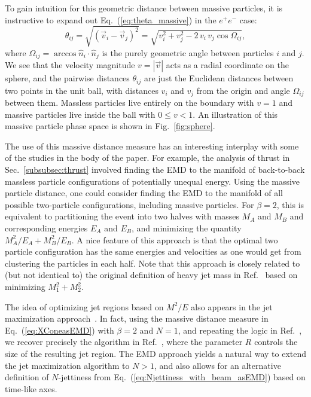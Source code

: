 \documentclass[letterpaper,11pt]{article}
\DeclareRobustCommand{\Sec}[1]{Sec.~\ref{#1}}
\DeclareRobustCommand{\Fig}[1]{Fig.~\ref{#1}}
\DeclareRobustCommand{\Eq}[1]{Eq.~(\ref{#1})}
\DeclareRobustCommand{\Ref}[1]{Ref.~\cite{#1}}
\begin{document}
To gain intuition for this geometric distance between massive particles, it is instructive to expand out \Eq{eq:theta_massive} in the $e^+e^-$ case:
%
\begin{equation}
\theta_{ij}=\sqrt{\left(\vec v_i-\vec v_j\right)^2}=\sqrt{v_i^2+v_j^2 - 2 \, v_i \, v_j \cos \Omega_{ij}},
\end{equation}
%
where $\Omega_{ij}=\arccos \hat n_i\cdot \hat n_j$ is the purely geometric angle between particles $i$ and $j$.
%
We see that the velocity magnitude $v = |\vec{v}|$ acts as a radial coordinate on the sphere, and the pairwise distances $\theta_{ij}$ are just the Euclidean distances between two points in the unit ball, with distances $v_i$ and $v_j$ from the origin and angle $\Omega_{ij}$ between them.
%
Massless particles live entirely on the boundary with $v=1$ and massive particles live inside the ball with $0\le v<1$.
%
An illustration of this massive particle phase space is shown in \Fig{fig:sphere}.


The use of this massive distance measure has an interesting interplay with some of the studies in the body of the paper.
%
For example, the analysis of thrust in \Sec{subsubsec:thrust} involved finding the EMD to the manifold of back-to-back massless particle configurations of potentially unequal energy.
%
Using the massive particle distance, one could consider finding the EMD to the manifold of all possible two-particle configurations, including massive particles.
%
For $\beta = 2$, this is equivalent to partitioning the event into two halves with masses $M_A$ and $M_B$ and corresponding energies $E_A$ and $E_B$, and minimizing the quantity $M_A^2 / E_A + M_B^2 / E_B$.
%
A nice feature of this approach is that the optimal two particle configuration has the same energies and velocities as one would get from clustering the particles in each half.
%
Note that this approach is closely related to (but not identical to) the original definition of heavy jet mass in \Ref{Clavelli:1981yh} based on minimizing $M_1^2 + M_2^2$.


The idea of optimizing jet regions based on $M^2 / E$ also appears in the jet maximization approach~\cite{Georgi:2014zwa}.
%
In fact, using the massive distance measure in \Eq{eq:XConeasEMD} with $\beta = 2$ and $N=1$, and repeating the logic in \Ref{Thaler:2015uja}, we recover precisely the algorithm in \Ref{Georgi:2014zwa}, where the parameter $R$ controls the size of the resulting jet region.
%
The EMD approach yields a natural way to extend the jet maximization algorithm to $N > 1$, and also allows for an alternative definition of $N$-jettiness from \Eq{eq:Njettiness_with_beam_asEMD} based on time-like axes.
\end{document}
